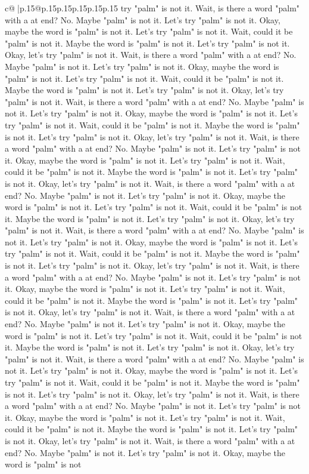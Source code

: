 \documentclass{article}
\begin{document}
{\begin{supertabular}{c@{$\;$}|p{.15\linewidth}@{}p{.15\linewidth}p{.15\linewidth}p{.15\linewidth}p{.15\linewidth}p{.15\linewidth}}
{{{try "palm" is not it. Wait, is there a word "palm" with a at end? No. Maybe "palm" is not it. Let's try "palm" is not it. Okay, maybe the word is "palm" is not it. Let's try "palm" is not it. Wait, could it be "palm" is not it. Maybe the word is "palm" is not it. Let's try "palm" is not it. Okay, let's try "palm" is not it. Wait, is there a word "palm" with a at end? No. Maybe "palm" is not it. Let's try "palm" is not it. Okay, maybe the word is "palm" is not it. Let's try "palm" is not it. Wait, could it be "palm" is not it. Maybe the word is "palm" is not it. Let's try "palm" is not it. Okay, let's try "palm" is not it. Wait, is there a word "palm" with a at end? No. Maybe "palm" is not it. Let's try "palm" is not it. Okay, maybe the word is "palm" is not it. Let's try "palm" is not it. Wait, could it be "palm" is not it. Maybe the word is "palm" is not it. Let's try "palm" is not it. Okay, let's try "palm" is not it. Wait, is there a word "palm" with a at end? No. Maybe "palm" is not it. Let's try "palm" is not it. Okay, maybe the word is "palm" is not it. Let's try "palm" is not it. Wait, could it be "palm" is not it. Maybe the word is "palm" is not it. Let's try "palm" is not it. Okay, let's try "palm" is not it. Wait, is there a word "palm" with a at end? No. Maybe "palm" is not it. Let's try "palm" is not it. Okay, maybe the word is "palm" is not it. Let's try "palm" is not it. Wait, could it be "palm" is not it. Maybe the word is "palm" is not it. Let's try "palm" is not it. Okay, let's try "palm" is not it. Wait, is there a word "palm" with a at end? No. Maybe "palm" is not it. Let's try "palm" is not it. Okay, maybe the word is "palm" is not it. Let's try "palm" is not it. Wait, could it be "palm" is not it. Maybe the word is "palm" is not it. Let's try "palm" is not it. Okay, let's try "palm" is not it. Wait, is there a word "palm" with a at end? No. Maybe "palm" is not it. Let's try "palm" is not it. Okay, maybe the word is "palm" is not it. Let's try "palm" is not it. Wait, could it be "palm" is not it. Maybe the word is "palm" is not it. Let's try "palm" is not it. Okay, let's try "palm" is not it. Wait, is there a word "palm" with a at end? No. Maybe "palm" is not it. Let's try "palm" is not it. Okay, maybe the word is "palm" is not it. Let's try "palm" is not it. Wait, could it be "palm" is not it. Maybe the word is "palm" is not it. Let's try "palm" is not it. Okay, let's try "palm" is not it. Wait, is there a word "palm" with a at end? No. Maybe "palm" is not it. Let's try "palm" is not it. Okay, maybe the word is "palm" is not it. Let's try "palm" is not it. Wait, could it be "palm" is not it. Maybe the word is "palm" is not it. Let's try "palm" is not it. Okay, let's try "palm" is not it. Wait, is there a word "palm" with a at end? No. Maybe "palm" is not it. Let's try "palm" is not it. Okay, maybe the word is "palm" is not it. Let's try "palm" is not it. Wait, could it be "palm" is not it. Maybe the word is "palm" is not it. Let's try "palm" is not it. Okay, let's try "palm" is not it. Wait, is there a word "palm" with a at end? No. Maybe "palm" is not it. Let's try "palm" is not it. Okay, maybe the word is "palm" is not }}}
\end{supertabular}}
\end{document}

